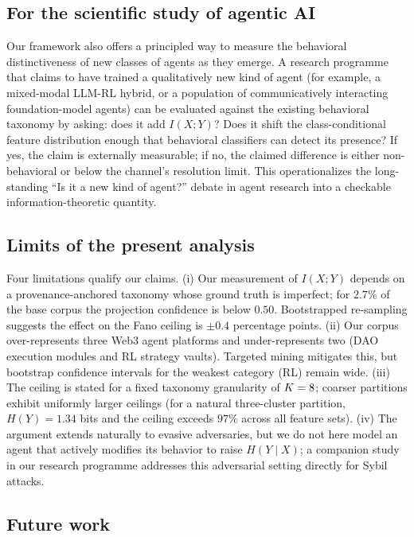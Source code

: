 \documentclass[11pt,a4paper]{article}
\begin{document}
\subsection*{For the scientific study of agentic AI}

Our framework also offers a principled way to measure the behavioral
distinctiveness of new classes of agents as they emerge. A research
programme that claims to have trained a qualitatively new kind of agent
(for example, a mixed-modal LLM-RL hybrid, or a population of
communicatively interacting foundation-model agents) can be evaluated
against the existing behavioral taxonomy by asking: does it add
$I(X;Y)$? Does it shift the class-conditional feature distribution
enough that behavioral classifiers can detect its presence? If yes, the
claim is externally measurable; if no, the claimed difference is
either non-behavioral or below the channel's resolution limit. This
operationalizes the long-standing ``Is it a new kind of agent?'' debate
in agent research\cite{franklin1996agent,wooldridge1995intelligent,jennings1998roadmap}
into a checkable information-theoretic quantity.

\subsection*{Limits of the present analysis}

Four limitations qualify our claims. (i) Our measurement of $I(X;Y)$
depends on a provenance-anchored taxonomy whose ground truth is
imperfect; for $2.7\%$ of the base corpus the projection confidence is
below $0.50$. Bootstrapped re-sampling suggests the effect on the Fano
ceiling is $\pm 0.4$ percentage points. (ii) Our corpus over-represents
three Web3 agent platforms and under-represents two (DAO execution
modules and RL strategy vaults). Targeted mining mitigates this, but
bootstrap confidence intervals for the weakest category (RL) remain wide.
(iii) The ceiling is stated for a fixed taxonomy granularity of $K=8$;
coarser partitions exhibit uniformly larger ceilings (for a natural
three-cluster partition, $H(Y) = 1.34$ bits and the ceiling exceeds
$97\%$ across all feature sets). (iv) The argument extends naturally to
evasive adversaries, but we do not here model an agent that actively
modifies its behavior to raise $H(Y\mid X)$; a companion study in our
research programme addresses this adversarial setting directly for
Sybil attacks.

\subsection*{Future work}
\end{document}
